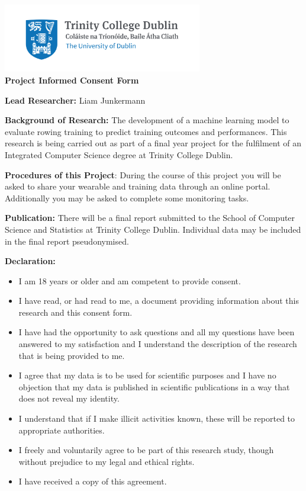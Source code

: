 \begin{center}
    \includegraphics[height=3cm]{info-sheet/Trinity_RGB_transparent_main.png}\\
    {\large\textbf{Project Informed Consent Form}}
\end{center}
\vspace{1cm}

\textbf{Lead Researcher:} Liam Junkermann

\textbf{Background of Research:} The development of a machine learning model to evaluate rowing training to predict training outcomes and performances. This research is being carried out as part of a final year project for the fulfilment of an Integrated Computer Science degree at Trinity College Dublin.

\textbf{Procedures of this Project}: During the course of this project you will be asked to share your wearable and training data through an online portal. Additionally you may be asked to complete some monitoring tasks.

\textbf{Publication:} There will be a final report submitted to the School of Computer Science and Statistics at Trinity College Dublin. Individual data may be included in the final report pseudonymised.

\textbf{Declaration:}
\begin{itemize}
    \item I am 18 years or older and am competent to provide consent.
    \item I have read, or had read to me, a document providing information about this research and this consent form.
    \item I have had the opportunity to ask questions and all my questions have been answered to my satisfaction and I understand the description of the research that is being provided to me.
    \item I agree that my data is to be used for scientific purposes and I have no objection that my data is published in scientific publications in a way that does not reveal my identity.
    \item I understand that if I make illicit activities known, these will be reported to appropriate authorities.
    \item I freely and voluntarily agree to be part of this research study, though without prejudice to my legal and ethical rights.
    \item I have received a copy of this agreement.
\end{itemize}

